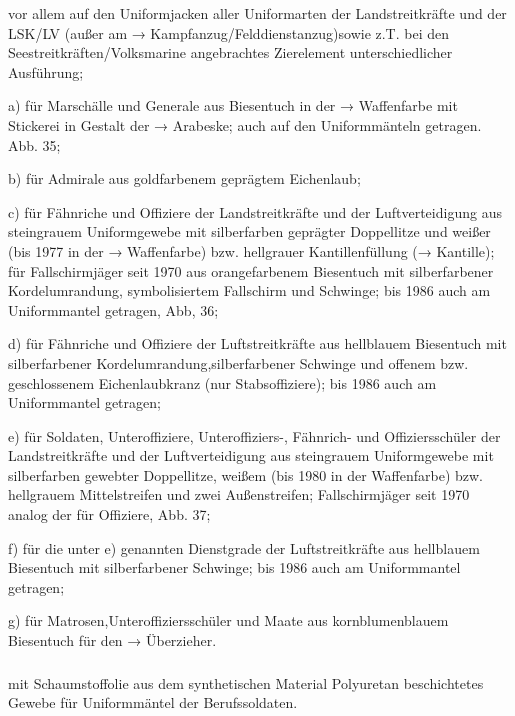 vor allem auf den Uniformjacken aller Uniformarten der Landstreitkräfte und der LSK/LV (außer am → Kampfanzug/Felddienstanzug)sowie z.T. bei den Seestreitkräften/Volksmarine angebrachtes Zierelement unterschiedlicher Ausführung;

a) für Marschälle und Generale aus Biesentuch in der → Waffenfarbe mit Stickerei in Gestalt der → Arabeske; auch auf den Uniformmänteln getragen. Abb. 35;

b) für Admirale aus goldfarbenem geprägtem Eichenlaub;

c) für Fähnriche und Offiziere der Landstreitkräfte und der Luftverteidigung aus steingrauem Uniformgewebe mit silberfarben geprägter Doppellitze und weißer (bis 1977 in der → Waffenfarbe) bzw. hellgrauer Kantillenfüllung (→ Kantille); für Fallschirmjäger seit 1970 aus orangefarbenem Biesentuch mit silberfarbener Kordelumrandung, symbolisiertem Fallschirm und Schwinge; bis 1986 auch am Uniformmantel getragen, Abb, 36;

d) für Fähnriche und Offiziere der Luftstreitkräfte aus hellblauem Biesentuch mit silberfarbener Kordelumrandung,silberfarbener Schwinge und offenem bzw. geschlossenem Eichenlaubkranz (nur Stabsoffiziere); bis 1986 auch am Uniformmantel getragen;

e) für Soldaten, Unteroffiziere, Unteroffiziers-, Fähnrich- und Offiziersschüler der Landstreitkräfte und der Luftverteidigung aus steingrauem Uniformgewebe mit silberfarben gewebter Doppellitze, weißem (bis 1980 in der
Waffenfarbe) bzw. hellgrauem Mittelstreifen und zwei Außenstreifen; Fallschirmjäger seit 1970 analog der für Offiziere, Abb. 37;

f) für die unter e) genannten Dienstgrade der Luftstreitkräfte aus hellblauem Biesentuch mit silberfarbener Schwinge; bis 1986 auch am Uniformmantel getragen;

g) für Matrosen,Unteroffiziersschüler und Maate aus kornblumenblauem Biesentuch für den → Überzieher.

\subsubsection*{}%

mit Schaumstoffolie aus dem synthetischen Material Polyuretan beschichtetes Gewebe für Uniformmäntel der Berufssoldaten.

\subsubsection*{}%

